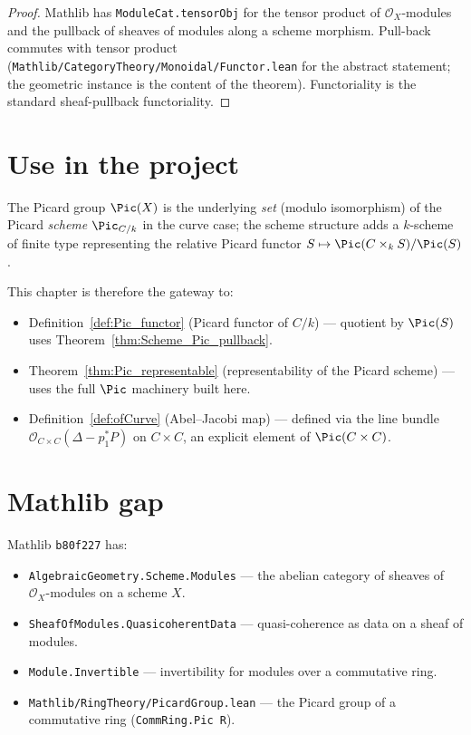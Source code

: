 \begin{proof}
  \leanok
  Mathlib has \lstinline{ModuleCat.tensorObj} for the tensor product of $\mathcal O_X$-modules and the pullback of sheaves of modules along a scheme morphism. Pull-back commutes with tensor product (\lstinline{Mathlib/CategoryTheory/Monoidal/Functor.lean} for the abstract statement; the geometric instance is the content of the theorem). Functoriality is the standard sheaf-pullback functoriality.
\end{proof}

\section{Use in the project}

The Picard group $\Pic(X)$ is the underlying \emph{set} (modulo isomorphism) of the Picard \emph{scheme} $\Pic_{C/k}$ in the curve case; the scheme structure adds a $k$-scheme of finite type representing the relative Picard functor $S \mapsto \Pic(C \times_k S) / \Pic(S)$.

This chapter is therefore the gateway to:
\begin{itemize}
  \item Definition~\ref{def:Pic_functor} (Picard functor of $C/k$) — quotient by $\Pic(S)$ uses Theorem~\ref{thm:Scheme_Pic_pullback}.
  \item Theorem~\ref{thm:Pic_representable} (representability of the Picard scheme) — uses the full $\Pic$ machinery built here.
  \item Definition~\ref{def:ofCurve} (Abel--Jacobi map) — defined via the line bundle $\mathcal O_{C \times C}(\Delta - p_1^* P)$ on $C \times C$, an explicit element of $\Pic(C \times C)$.
\end{itemize}

\section{Mathlib gap}

Mathlib \texttt{b80f227} has:
\begin{itemize}
  \item \lstinline{AlgebraicGeometry.Scheme.Modules} — the abelian category of sheaves of $\mathcal O_X$-modules on a scheme $X$.
  \item \lstinline{SheafOfModules.QuasicoherentData} — quasi-coherence as data on a sheaf of modules.
  \item \lstinline{Module.Invertible} — invertibility for modules over a commutative ring.
  \item \lstinline{Mathlib/RingTheory/PicardGroup.lean} — the Picard group of a commutative ring (\lstinline{CommRing.Pic R}).
\end{itemize}

